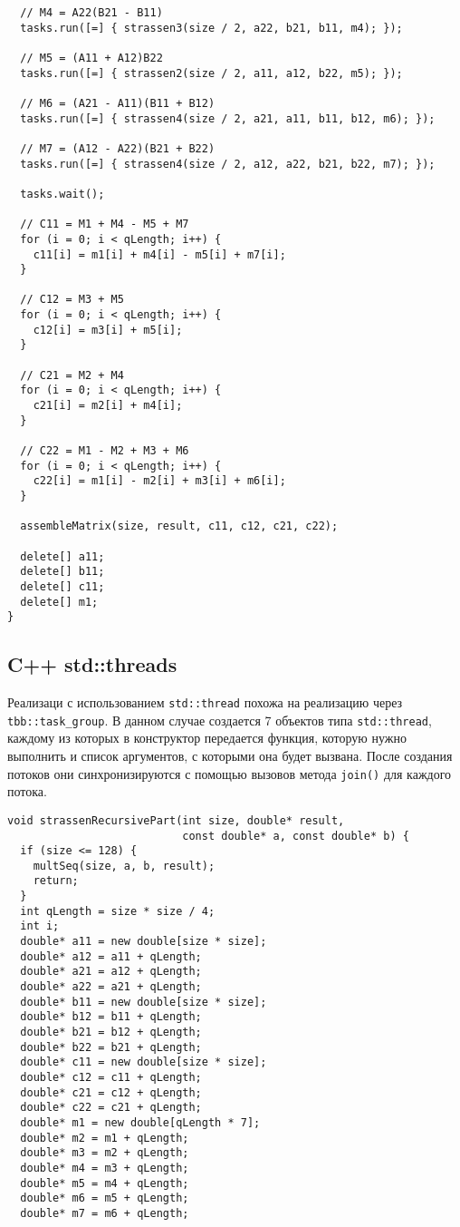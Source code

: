 \documentclass{report}
\begin{document}
\begin{center}
\begin{lstlisting}
  // M4 = A22(B21 - B11)
  tasks.run([=] { strassen3(size / 2, a22, b21, b11, m4); });

  // M5 = (A11 + A12)B22
  tasks.run([=] { strassen2(size / 2, a11, a12, b22, m5); });

  // M6 = (A21 - A11)(B11 + B12)
  tasks.run([=] { strassen4(size / 2, a21, a11, b11, b12, m6); });

  // M7 = (A12 - A22)(B21 + B22)
  tasks.run([=] { strassen4(size / 2, a12, a22, b21, b22, m7); });

  tasks.wait();

  // C11 = M1 + M4 - M5 + M7
  for (i = 0; i < qLength; i++) {
    c11[i] = m1[i] + m4[i] - m5[i] + m7[i];
  }

  // C12 = M3 + M5
  for (i = 0; i < qLength; i++) {
    c12[i] = m3[i] + m5[i];
  }

  // C21 = M2 + M4
  for (i = 0; i < qLength; i++) {
    c21[i] = m2[i] + m4[i];
  }

  // C22 = M1 - M2 + M3 + M6
  for (i = 0; i < qLength; i++) {
    c22[i] = m1[i] - m2[i] + m3[i] + m6[i];
  }

  assembleMatrix(size, result, c11, c12, c21, c22);

  delete[] a11;
  delete[] b11;
  delete[] c11;
  delete[] m1;
}
\end{lstlisting}

\subsection{C++ std::threads}

Реализаци с использованием \lstinline{std::thread} похожа на реализацию через \lstinline{tbb::task_group}. В данном случае создается 7 объектов типа \lstinline{std::thread}, каждому из которых в конструктор передается функция, которую нужно выполнить и список аргументов, с которыми она будет вызвана. После создания потоков они синхронизируются с помощью вызовов метода \lstinline{join()} для каждого потока.

\begin{lstlisting}
void strassenRecursivePart(int size, double* result,
                           const double* a, const double* b) {
  if (size <= 128) {
    multSeq(size, a, b, result);
    return;
  }
  int qLength = size * size / 4;
  int i;
  double* a11 = new double[size * size];
  double* a12 = a11 + qLength;
  double* a21 = a12 + qLength;
  double* a22 = a21 + qLength;
  double* b11 = new double[size * size];
  double* b12 = b11 + qLength;
  double* b21 = b12 + qLength;
  double* b22 = b21 + qLength;
  double* c11 = new double[size * size];
  double* c12 = c11 + qLength;
  double* c21 = c12 + qLength;
  double* c22 = c21 + qLength;
  double* m1 = new double[qLength * 7];
  double* m2 = m1 + qLength;
  double* m3 = m2 + qLength;
  double* m4 = m3 + qLength;
  double* m5 = m4 + qLength;
  double* m6 = m5 + qLength;
  double* m7 = m6 + qLength;


\end{lstlisting}
\end{center}
\end{document}
